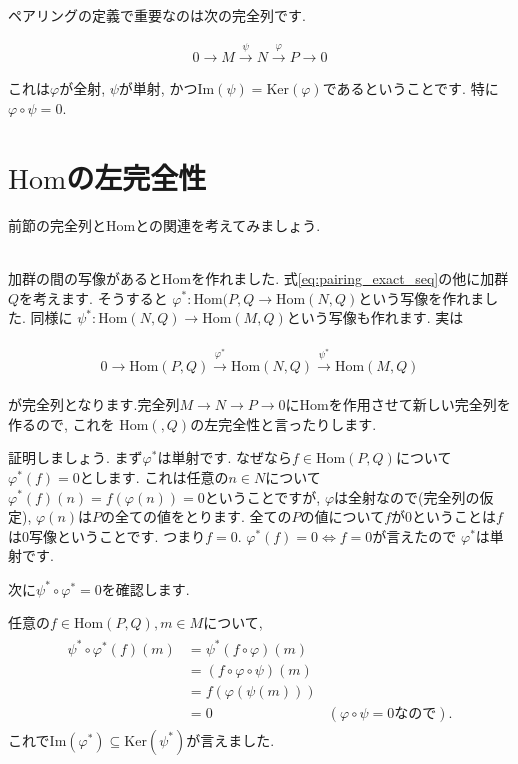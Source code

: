 \documentclass{jsarticle}
\def\Im{\mathrm{Im}}
\def\Ker{\mathrm{Ker}}
\def\Hom{\mathrm{Hom}}
\theoremstyle{definition}
\numberwithin{theorem}{section}
\begin{document}
ペアリングの定義で重要なのは次の完全列です.

\begin{equation}
\label{eq:pairing_exact_seq}
\begin{aligned}
0 \rightarrow M \xrightarrow{\displaystyle\psi} N \xrightarrow{\displaystyle\varphi} P\rightarrow 0
\end{aligned}
\end{equation}

これは$\varphi$が全射, $\psi$が単射, かつ$\Im(\psi) = \Ker(\varphi)$であるということです. 特に$\varphi\circ\psi = 0$.

\section{$\Hom$の左完全性}
前節の完全列と$\Hom$との関連を考えてみましょう.

\hrulefill\\

加群の間の写像があると$\Hom$を作れました. 式\ref{eq:pairing_exact_seq}の他に加群$Q$を考えます. そうすると
$\varphi^*: \Hom(P, Q \rightarrow \Hom(N, Q)$という写像を作れました. 同様に
$\psi^*: \Hom(N, Q) \rightarrow \Hom(M, Q)$という写像も作れます. 実は

\begin{eqnarray*}
\begin{aligned}
0 \rightarrow \Hom(P, Q) \xrightarrow{\varphi^*} \Hom(N, Q) \xrightarrow{\psi^*} \Hom(M, Q)
\end{aligned}
\end{eqnarray*}

が完全列となります.完全列$M\rightarrow N \rightarrow P \rightarrow 0$に$\Hom$を作用させて新しい完全列を作るので, これを
$\Hom(, Q)$の左完全性と言ったりします.

証明しましょう. まず$\varphi^*$は単射です. なぜなら$f \in \Hom(P, Q)$について$\varphi^*(f) = 0$とします. これは任意の$n\in N$について
$\varphi^*(f)(n) = f(\varphi(n)) = 0$ということですが, $\varphi$は全射なので(完全列の仮定), $\varphi(n)$は$P$の全ての値をとります.
全ての$P$の値について$f$が0ということは$f$は0写像ということです. つまり$f=0$. $\varphi^*(f) = 0 \Leftrightarrow f = 0$が言えたので
$\varphi^*$は単射です. 

次に$\psi^*\circ\varphi^* = 0$を確認します. 

任意の$f\in\Hom(P, Q), m \in M$について, 
\begin{eqnarray*}
\begin{aligned}
\psi^*\circ\varphi^*(f)(m) &= \psi^*(f\circ\varphi)(m)\\
&= (f\circ\varphi\circ\psi)(m)\\
&= f(\varphi(\psi(m)))\\
&= 0 & (\varphi\circ\psi = 0なので).
\end{aligned}
\end{eqnarray*}
これで$\Im(\varphi^*)\subseteq\Ker(\psi^*)$が言えました. 
\end{document}
